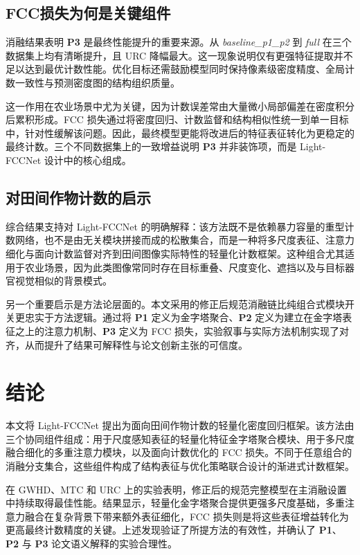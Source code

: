 \documentclass[a4paper,fleqn]{cas-sc}
\begin{document}
\subsection{FCC损失为何是关键组件}

消融结果表明 \textbf{P3} 是最终性能提升的重要来源。从 \textit{baseline\_p1\_p2} 到 \textit{full} 在三个数据集上均有清晰提升，且 URC 降幅最大。这一现象说明仅有更强特征提取并不足以达到最优计数性能。优化目标还需鼓励模型同时保持像素级密度精度、全局计数一致性与预测密度图的结构组织质量。

这一作用在农业场景中尤为关键，因为计数误差常由大量微小局部偏差在密度积分后累积形成。FCC 损失通过将密度回归、计数监督和结构相似性统一到单一目标中，针对性缓解该问题。因此，最终模型更能将改进后的特征表征转化为更稳定的最终计数。三个不同数据集上的一致增益说明 \textbf{P3} 并非装饰项，而是 Light-FCCNet 设计中的核心组成。

\subsection{对田间作物计数的启示}

综合结果支持对 Light-FCCNet 的明确解释：该方法既不是依赖暴力容量的重型计数网络，也不是由无关模块拼接而成的松散集合，而是一种将多尺度表征、注意力细化与面向计数监督对齐到田间图像实际特性的轻量化计数框架。这种组合尤其适用于农业场景，因为此类图像常同时存在目标重叠、尺度变化、遮挡以及与目标器官视觉相似的背景模式。

另一个重要启示是方法论层面的。本文采用的修正后规范消融链比纯组合式模块开关更忠实于方法逻辑。通过将 \textbf{P1} 定义为金字塔聚合、\textbf{P2} 定义为建立在金字塔表征之上的注意力机制、\textbf{P3} 定义为 FCC 损失，实验叙事与实际方法机制实现了对齐，从而提升了结果可解释性与论文创新主张的可信度。

\section{结论}

本文将 Light-FCCNet 提出为面向田间作物计数的轻量化密度回归框架。该方法由三个协同组件组成：用于尺度感知表征的轻量化特征金字塔聚合模块、用于多尺度融合细化的多重注意力模块，以及面向计数优化的 FCC 损失。不同于任意组合的消融分支集合，这些组件构成了结构表征与优化策略联合设计的渐进式计数框架。

在 GWHD、MTC 和 URC 上的实验表明，修正后的规范完整模型在主消融设置中持续取得最佳性能。结果显示，轻量化金字塔聚合提供更强多尺度基础，多重注意力融合在复杂背景下带来额外表征细化，FCC 损失则是将这些表征增益转化为更高最终计数精度的关键。上述发现验证了所提方法的有效性，并确认了 \textbf{P1}、\textbf{P2} 与 \textbf{P3} 论文语义解释的实验合理性。
\end{document}

